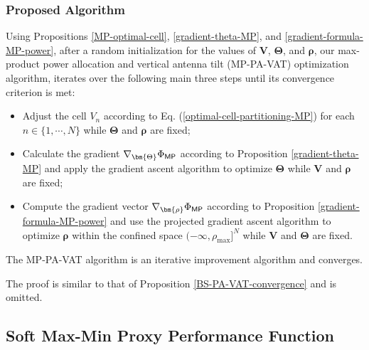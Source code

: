 \subsubsection{Proposed Algorithm}\label{MP-Algorithm}

Using Propositions \ref{MP-optimal-cell}, \ref{gradient-theta-MP}, and \ref{gradient-formula-MP-power}, %
after a random initialization for the values of $\bm{V}$, $\bm{\Theta}$, and $\bm{\rho}$, our %
max-product power allocation and vertical antenna tilt (MP-PA-VAT) optimization algorithm, iterates over the following main three steps until its convergence criterion is met: 
\begin{itemize}
    \item Adjust the cell $V_n$ according to Eq. (\ref{optimal-cell-partitioning-MP}) for each $n \in \{1, \cdots, N\}$ while $\bm{\Theta}$ and $\bm{\rho}$ are fixed;
    \item Calculate the gradient $\nabla_{\bm{\Theta}}\Phi_{{\sf MP}}$ according to Proposition \ref{gradient-theta-MP} and apply the gradient ascent algorithm to optimize $\bm{\Theta}$ while $\bm{V}$ and $\bm{\rho}$ are fixed;
    \item Compute the gradient vector $\nabla_{\bm{\rho}}\Phi_{{\sf MP}}$ according to Proposition \ref{gradient-formula-MP-power} and use the projected gradient ascent algorithm to optimize $\bm{\rho}$ within the confined space $(-\infty, \rho_{\max}]^N$ while $\bm{V}$ and $\bm{\Theta}$ are fixed.
\end{itemize}


\begin{Proposition}\label{MP-PA-VAT-convergence}
    The MP-PA-VAT algorithm is an iterative improvement algorithm and converges.
\end{Proposition}

The proof is similar to that of Proposition \ref{BS-PA-VAT-convergence} and is omitted.




\subsection{Soft Max-Min Proxy Performance Function}\label{SM-Subsection}


